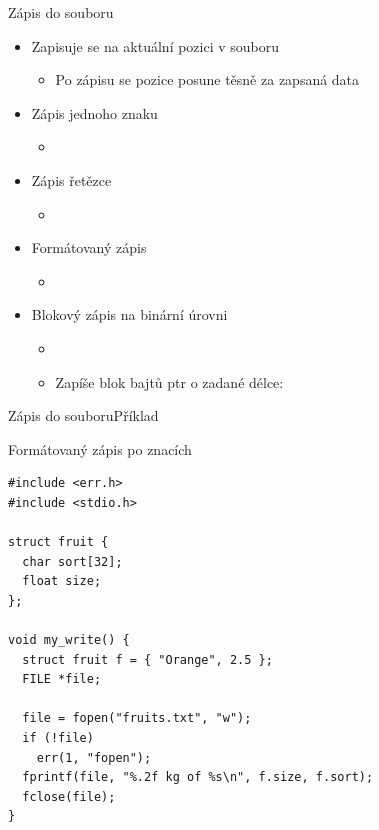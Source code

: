 \begin{frame}{Zápis do souboru}

  \begin{itemize}
    \item Zapisuje se na aktuální pozici v souboru
    \begin{itemize}
      \item Po zápisu se pozice posune těsně za zapsaná data
    \end{itemize}

    \pause

    \item Zápis jednoho znaku
    \begin{itemize}
      \item {}
    \end{itemize}

    \pause

    \item Zápis řetězce
    \begin{itemize}
      \item {}
    \end{itemize}

    \pause

    \item Formátovaný zápis
    \begin{itemize}
      \item {}
    \end{itemize}

    \pause

    \item Blokový zápis na binární úrovni
    \begin{itemize}
      \item {}
      \item Zapíše blok bajtů ptr o zadané délce: 
    \end{itemize}
  \end{itemize}

\end{frame}

\begin{frame}[fragile]{Zápis do souboru}{Příklad}

  \begin{block}{Formátovaný zápis po znacích}
  \begin{lstlisting}
#include <err.h>
#include <stdio.h>

struct fruit {
  char sort[32];
  float size;
};

void my_write() {
  struct fruit f = { "Orange", 2.5 };
  FILE *file;

  file = fopen("fruits.txt", "w");
  if (!file)
    err(1, "fopen");
  fprintf(file, "%.2f kg of %s\n", f.size, f.sort);
  fclose(file);
}
  \end{lstlisting}
  \end{block}

\end{frame}

